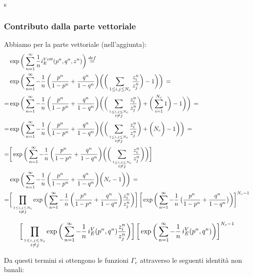 \documentclass[a4paper,12pt]{report}
\begin{document}
s \subsubsection{Contributo dalla parte vettoriale}
 Abbiamo per la parte vettoriale (nell'aggiunta):
 \begin{align*} &\exp \bigg( \sum_{n=1}^{\infty} {1 \over n} i_E^{Vett} (p^n,q^n,z^n) \bigg) \overset{def}{=} \\
 &\exp \bigg( \sum_{n=1}^{\infty} - {1 \over n} \, \bigg( {p^n \over 1-p^n} + {q^n \over 1-q^n} \bigg)  \bigg(\bigg( \sum_{ 1 \leq i,j \leq N_c}  {z_i^n \over z_j^n}  \bigg)- 1 \bigg) \bigg) \, = \\
 =&\exp \bigg( \sum_{n=1}^{\infty} - {1 \over n} \, \bigg( {p^n \over 1-p^n} + {q^n \over 1-q^n} \bigg)  \bigg( \bigg( \sum_{\overset{ 1 \leq i,j \leq N_c}{i \neq j}}  {z_i^n \over z_j^n} \bigg) + \bigg( \sum_{i=1}^{N_c} 1 \bigg)- 1 \bigg) \bigg) \, = \\
  =&\exp \bigg( \sum_{n=1}^{\infty} - {1 \over n} \, \bigg( {p^n \over 1-p^n} + {q^n \over 1-q^n} \bigg)  \bigg( \bigg( \sum_{\overset{ 1 \leq i,j \leq N_c}{i \neq j}}  {z_i^n \over z_j^n} \bigg) + \bigg( N_c \bigg)- 1 \bigg) \bigg) \, = \\
    =&\bigg[ \exp \bigg( \sum_{n=1}^{\infty} - {1 \over n} \, \bigg( {p^n \over 1-p^n} + {q^n \over 1-q^n} \bigg)  \bigg( \bigg( \sum_{\overset{ 1 \leq i,j \leq N_c}{i \neq j}}  {z_i^n \over z_j^n} \bigg) \bigg)\bigg] \\
	&    \exp \bigg( \sum_{n=1}^{\infty} - {1 \over n} \, \bigg( {p^n \over 1-p^n} + {q^n \over 1-q^n} \bigg)  \bigg( N_c - 1 \bigg) \bigg) \, = \\
=& \bigg[\prod_{\overset{ 1 \leq i,j \leq N_c}{i\neq j}} \exp \bigg( \sum_{n=1}^{\infty} - {1 \over n} \, \bigg( {p^n \over 1-p^n} + {q^n \over 1-q^n} \bigg)   {z_i^n \over z_j^n}\bigg) \bigg] \,  
\bigg[ \exp \bigg( \sum_{n=1}^{\infty} - {1 \over n} \, \big( {p^n \over 1-p^n} + {q^n \over 1-q^n} \big) \bigg) \bigg] ^{N_c-1}
\end{align*}

\begin{equation}
\bigg[\prod_{\overset{ 1 \leq i,j \leq N_c}{i\neq j}} \exp \bigg( \sum_{n=1}^{\infty} - {1 \over n} \, i_E^V(p^n,q^n)  {z_i^n \over z_j^n}\bigg) \bigg] \,  
\bigg[ \exp \bigg( \sum_{n=1}^{\infty} - {1 \over n} \,  i_E^V(p^n,q^n) \bigg) \bigg] ^{N_c-1}
\end{equation}

Da questi termini si ottengono le funzioni $\Gamma_e$ attraverso le seguenti identità non banali:
\end{document}
